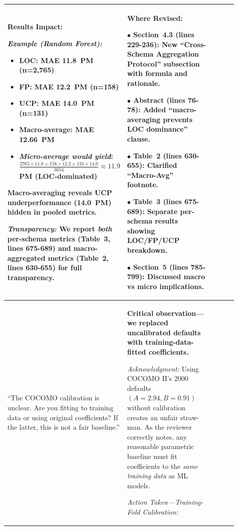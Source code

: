 \documentclass[11pt,a4paper]{article}
\begin{document}
\begin{longtable}{>{\raggedright\arraybackslash}p{0.26\linewidth}|>{\raggedright\arraybackslash}p{0.44\linewidth}|>{\raggedright\arraybackslash}p{0.22\linewidth}}
\textbf{Results Impact:}

\textit{Example (Random Forest):}
\begin{itemize}
    \item LOC: MAE 11.8~PM (n=2,765)
    \item FP: MAE 12.2~PM (n=158)
    \item UCP: MAE 14.0~PM (n=131)
    \item \textbf{Macro-average}: MAE 12.66~PM
    \item \textit{Micro-average would yield}: $\frac{2765 \times 11.8 + 158 \times 12.2 + 131 \times 14.0}{3054} \approx 11.9$ PM (LOC-dominated)
\end{itemize}

Macro-averaging reveals UCP underperformance (14.0~PM) hidden in pooled metrics.

\textit{Transparency:} We report \textit{both} per-schema metrics (Table~3, lines 675-689) and macro-aggregated metrics (Table~2, lines 630-655) for full transparency. &

\textbf{Where Revised:}

$\bullet$ \textbf{Section~4.3} (lines 229-236): New ``Cross-Schema Aggregation Protocol'' subsection with formula and rationale.

$\bullet$ \textbf{Abstract} (lines 76-78): Added ``macro-averaging prevents LOC dominance'' clause.

$\bullet$ \textbf{Table~2} (lines 630-655): Clarified ``Macro-Avg'' footnote.

$\bullet$ \textbf{Table~3} (lines 675-689): Separate per-schema results showing LOC/FP/UCP breakdown.

$\bullet$ \textbf{Section~5} (lines 785-799): Discussed macro vs micro implications. \\

\midrule


``The COCOMO calibration is unclear. Are you fitting to training data or using original coefficients? If the latter, this is not a  fair baseline.'' &

\textbf{Critical observation---we replaced uncalibrated defaults with training-data-fitted coefficients.}

\textit{Acknowledgment:} Using COCOMO II's 2000 defaults $(A=2.94, B=0.91)$ without calibration creates an unfair straw-man. As the reviewer correctly notes, any reasonable parametric baseline must fit coefficients to the \textit{same training data} as ML models.

\textit{Action Taken---Training-Fold Calibration:}


\end{longtable}
\end{document}
